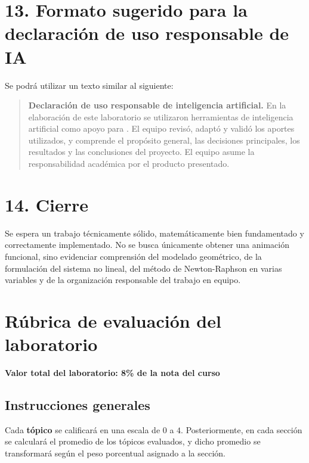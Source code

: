\documentclass[12pt]{article}
\begin{document}
\section*{13. Formato sugerido para la declaración de uso responsable de IA}

Se podrá utilizar un texto similar al siguiente:

\begin{quote}
\textbf{Declaración de uso responsable de inteligencia artificial.} En la elaboración de este laboratorio se utilizaron herramientas de inteligencia artificial como apoyo para \underline{\hspace{5cm}}. El equipo revisó, adaptó y validó los aportes utilizados, y comprende el propósito general, las decisiones principales, los resultados y las conclusiones del proyecto. El equipo asume la responsabilidad académica por el producto presentado.
\end{quote}

\section*{14. Cierre}

Se espera un trabajo técnicamente sólido, matemáticamente bien fundamentado y correctamente implementado. No se busca únicamente obtener una animación funcional, sino evidenciar comprensión del modelado geométrico, de la formulación del sistema no lineal, del método de Newton-Raphson en varias variables y de la organización responsable del trabajo en equipo.

\vfill


\section*{Rúbrica de evaluación del laboratorio}
\textbf{Valor total del laboratorio: 8\% de la nota del curso}

\subsection*{Instrucciones generales}
Cada \textbf{tópico} se calificará en una escala de \(0\) a \(4\). Posteriormente, en cada sección se calculará el promedio de los tópicos evaluados, y dicho promedio se transformará según el peso porcentual asignado a la sección.

%
\end{document}

